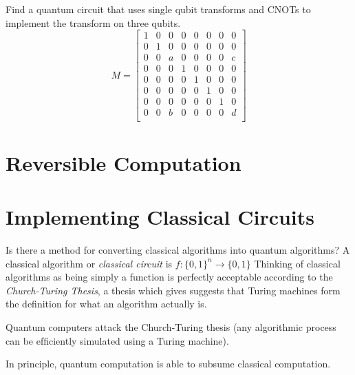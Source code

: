 \frmrule 

\begin{example}
Find a quantum circuit that uses single qubit transforms and CNOTs to implement the transform on three qubits.
$$
M = \begin{bmatrix}
       1 & 0 & 0 & 0 & 0 & 0 & 0 & 0  \\
       0 & 1 & 0 & 0 & 0 & 0 & 0 & 0  \\
       0 & 0 & a & 0 & 0 & 0 & 0 & c  \\
       0 & 0 & 0 & 1 & 0 & 0 & 0 & 0  \\
       0 & 0 & 0 & 0 & 1 & 0 & 0 & 0  \\
       0 & 0 & 0 & 0 & 0 & 1 & 0 & 0  \\
       0 & 0 & 0 & 0 & 0 & 0 & 1 & 0  \\
       0 & 0 & b & 0 & 0 & 0 & 0 & d  \\
     \end{bmatrix}
$$
\end{example}


\section{Reversible Computation}





\section{Implementing Classical Circuits}

Is there a method for converting classical algorithms into quantum algorithms?
A classical algorithm or \textit{classical circuit} is $f : \{0,1\}^n \rightarrow \{0,1\}$
Thinking of classical algorithms as being simply a function is perfectly acceptable 
according to the \textit{Church-Turing Thesis}, a thesis which gives 
suggests that Turing machines form the definition 
for what an algorithm actually is.

Quantum computers attack the Church-Turing thesis (any algorithmic
process can be efﬁciently simulated using a Turing
machine).


In principle, quantum computation is able to subsume classical computation.


